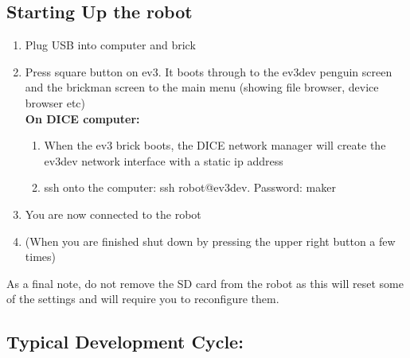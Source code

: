 \documentclass{article}
\begin{document}
  \subsection{Starting Up the robot}
  \begin{enumerate}
      \item Plug USB into computer and brick 
      \item Press square button on ev3. It boots through to the ev3dev penguin screen and the 
          brickman screen to the main menu (showing file browser, device browser etc) \\
          \textbf{On DICE computer:} 
          \begin{enumerate}
              \item When the ev3 brick boots, the DICE network manager will create the ev3dev 
  network interface with a static ip address
              \item ssh onto the computer: ssh robot@ev3dev. Password: maker 
          \end{enumerate}
      \item You are now connected to the robot 
      \item (When you are finished shut down by pressing the upper right button a few times)
  \end{enumerate}
   
  As a final note, do not remove the SD card from the robot as this will reset some of the settings 
  and will require you to reconfigure them.

  \subsection{Typical Development Cycle:}
\end{document}
